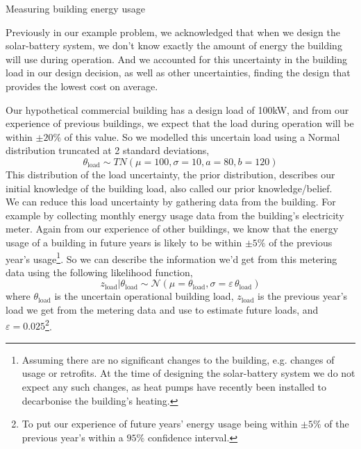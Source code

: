 \begin{ebox}[label=ebox:bayes]{Measuring building energy usage}

    Previously in our example problem, we acknowledged that when we design the solar-battery system, we don't know exactly the amount of energy the building will use during operation. And we accounted for this uncertainty in the building load in our design decision, as well as other uncertainties, finding the design that provides the lowest cost on average.

    Our hypothetical commercial building has a design load of 100kW, and from our experience of previous buildings, we expect that the load during operation will be within $\pm20\%$ of this value. So we modelled this uncertain load using a Normal distribution truncated at 2 standard deviations,
    \begin{equation*}
        \theta_{\text{load}} \sim TN(\mu=100, \sigma=10, a=80, b=120)
    \end{equation*}
    This distribution of the load uncertainty, the prior distribution, describes our initial knowledge of the building load, also called our prior knowledge/belief.\\

    We can reduce this load uncertainty by gathering data from the building. For example by collecting monthly energy usage data from the building's electricity meter. Again from our experience of other buildings, we know that the energy usage of a building in future years is likely to be within $\pm5\%$ of the previous year's usage\footnote{Assuming there are no significant changes to the building, e.g. changes of usage or retrofits. At the time of designing the solar-battery system we do not expect any such changes, as heat pumps have recently been installed to decarbonise the building's heating.}.
    So we can describe the information we'd get from this metering data using the following likelihood function,
    \begin{equation*}
        z_{\text{load}}|\theta_{\text{load}} \sim \mathcal{N}(\mu=\theta_{\text{load}}, \sigma=\varepsilon\,\theta_{\text{load}})
    \end{equation*}
    where $\theta_{\text{load}}$ is the uncertain operational building load, $z_{\text{load}}$ is the previous year's load we get from the metering data and use to estimate future loads, and $\varepsilon=0.025$\footnote{To put our experience of future years' energy usage being within $\pm5\%$ of the previous year's within a $95\%$ confidence interval.}.\\


\end{ebox}
